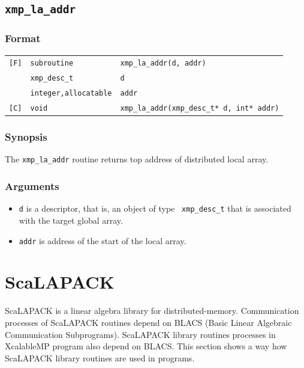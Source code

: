 \subsection{\tt xmp\_la\_addr}

\subsubsection*{Format}

\begin{tabular}{lll}

\verb![F]!&  {\tt subroutine}& {\tt xmp\_la\_addr(d, addr)}\\
          & {\tt xmp\_desc\_t} & {\tt d}\\
          & {\tt integer,allocatable} & {\tt addr}\\

\verb![C]!&  {\tt void}& {\tt xmp\_la\_addr(xmp\_desc\_t* d, int* addr)}\\

\end{tabular}

\subsubsection*{Synopsis}

The {\tt xmp\_la\_addr} routine returns top address of distributed local array.

\subsubsection*{Arguments}

\begin{itemize}
 \item {\tt d} is a descriptor, that is, an object of type {\tt
       xmp\_desc\_t} that is associated with the target global array.
 \item {\tt addr} is address of the start of the local array.
\end{itemize}

\section{ScaLAPACK}

   ScaLAPACK is a linear algebra library for distributed-memory.
   Communication processes of ScaLAPACK routines depend on BLACS
   (Basic Linear Algebraic Communication Subprograms).
   ScaLAPACK library routines processes in XcalableMP program also depend on 
   BLACS. This section shows a way how ScaLAPACK library routines are used in
   {\XMP} programs.

